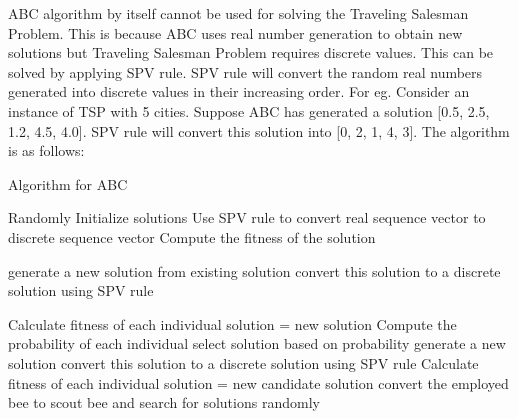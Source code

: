 \documentclass[conference]{IEEEtran}
\begin{document}
ABC algorithm by itself cannot be used for solving the Traveling Salesman Problem. This is because ABC uses real number generation to obtain new solutions but Traveling Salesman Problem requires discrete values. This can be solved by applying SPV rule. SPV rule will convert the random real numbers generated into discrete values in their increasing order. For eg. Consider an instance of TSP with 5 cities. Suppose ABC has generated  a solution [0.5, 2.5, 1.2, 4.5, 4.0]. SPV rule will convert this solution into [0, 2, 1, 4, 3].  The algorithm is as follows:


\begin{algorithm}[H]
\caption{Algorithm for ABC}
\begin{algorithmic}[1]
\STATE Randomly Initialize solutions
\STATE Use SPV rule to convert real sequence vector to discrete sequence vector
\ENDFOR 
\STATE Compute the fitness of the solution
\ENDFOR 

\REPEAT
{}

\STATE generate a new solution from existing solution
\STATE convert this solution to a discrete solution using SPV rule
\ENDFOR 


\STATE Calculate fitness of each individual
\STATE solution = new solution
\ENDIF
\ENDFOR
\STATE Compute the probability of each individual
\STATE select solution based on probability
\STATE generate a new solution
\STATE convert this solution to a discrete solution using SPV rule
\ENDFOR
\STATE Calculate fitness of each individual
\STATE solution = new candidate solution
\ENDIF
\ENDFOR
{}
\STATE convert the employed bee to scout bee and search for solutions randomly
\ENDIF

\end{algorithmic}
\end{algorithm}
\end{document}
